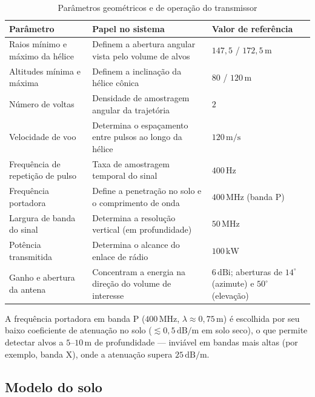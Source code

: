\documentclass[11pt,a4paper]{article}
\begin{document}
\begin{table}[H]
\centering
\caption{Parâmetros geométricos e de operação do transmissor}
\label{tab:radar_params}
\small
\begin{tabular}{@{}p{4.6cm}p{6.6cm}p{2.8cm}@{}}
\toprule
Parâmetro & Papel no sistema & Valor de referência \\
\midrule
Raios mínimo e máximo da hélice & Definem a abertura angular vista pelo volume de alvos & $147{,}5$ / $172{,}5\,\text{m}$ \\
Altitudes mínima e máxima & Definem a inclinação da hélice cônica & $80$ / $120\,\text{m}$ \\
Número de voltas & Densidade de amostragem angular da trajetória & $2$ \\
Velocidade de voo & Determina o espaçamento entre pulsos ao longo da hélice & $120\,\text{m/s}$ \\
Frequência de repetição de pulso & Taxa de amostragem temporal do sinal & $400\,\text{Hz}$ \\
Frequência portadora & Define a penetração no solo e o comprimento de onda & $400\,\text{MHz}$ (banda P) \\
Largura de banda do sinal & Determina a resolução vertical (em profundidade) & $50\,\text{MHz}$ \\
Potência transmitida & Determina o alcance do enlace de rádio & $100\,\text{kW}$ \\
Ganho e abertura da antena & Concentram a energia na direção do volume de interesse & $6\,\text{dBi}$; aberturas de $14^\circ$ (azimute) e $50^\circ$ (elevação) \\
\bottomrule
\end{tabular}
\normalsize
\end{table}

A frequência portadora em banda P ($400\,\text{MHz}$, $\lambda\approx0{,}75\,\text{m}$) é escolhida
por seu baixo coeficiente de atenuação no solo ($\lesssim 0{,}5\,\text{dB/m}$ em solo seco), o que
permite detectar alvos a $5$--$10\,\text{m}$ de profundidade — inviável em bandas mais altas (por
exemplo, banda X), onde a atenuação supera $25\,\text{dB/m}$.

\subsection{Modelo do solo}
\end{document}
